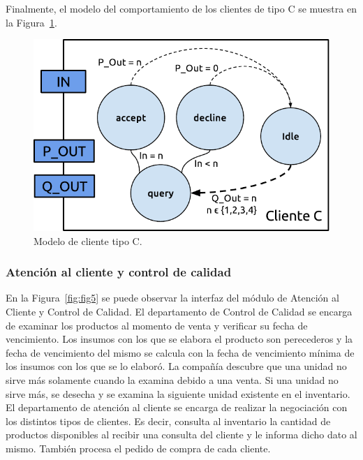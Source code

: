 \documentclass[10pt]{article}
\begin{document}
Finalmente, el modelo del comportamiento de los clientes de tipo C se muestra en la Figura~\ref{fig:fig4}.

\begin{figure}
\centering
\includegraphics[scale=1]{img/figura4}
\caption{Modelo de cliente tipo C.}
\label{fig:fig4}
\end{figure}

\subsubsection{Atención al cliente y control de calidad}
En la Figura~\ref{fig:fig5} se puede observar la interfaz del módulo de Atención al Cliente y Control de Calidad.
El departamento de Control de Calidad se encarga de examinar los productos al momento de venta y verificar su fecha de vencimiento. Los insumos con los que se elabora el producto son perecederos y la fecha de vencimiento del mismo se calcula con la fecha de vencimiento mínima de los insumos con los que se lo elaboró. La compañía descubre que una unidad no sirve más solamente cuando la examina debido a una venta. Si una unidad no sirve más, se desecha y se examina la siguiente unidad existente en el inventario.
El departamento de atención al cliente se encarga de realizar la negociación con los distintos tipos de clientes. Es decir, consulta al inventario la cantidad de productos disponibles al recibir una consulta del cliente y le informa dicho dato al mismo. También procesa el pedido de compra de cada cliente.
             
\end{document}
